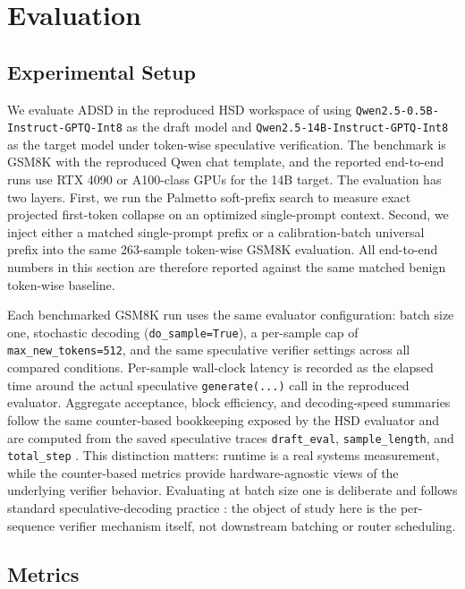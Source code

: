\section{Evaluation}
\label{sec:eval}

\subsection{Experimental Setup}

We evaluate ADSD in the reproduced HSD workspace of
\citet{zhou2026hsd} using \texttt{Qwen2.5-0.5B-Instruct-GPTQ-Int8} as the
draft model and \texttt{Qwen2.5-14B-Instruct-GPTQ-Int8} as the target model
under token-wise speculative verification. The benchmark is GSM8K with the
reproduced Qwen chat template, and the reported end-to-end runs use RTX 4090
or A100-class GPUs for the 14B target. The evaluation has two layers. First,
we run the Palmetto soft-prefix search to measure exact projected first-token
collapse on an optimized single-prompt context. Second, we inject either a matched
single-prompt prefix or a calibration-batch universal prefix into the same
263-sample token-wise GSM8K evaluation. All end-to-end numbers in this section
are therefore reported against the same matched benign token-wise baseline.

Each benchmarked GSM8K run uses the same evaluator configuration: batch size
one, stochastic decoding (\texttt{do\_sample=True}), a per-sample cap of
\texttt{max\_new\_tokens=512}, and the same speculative verifier settings
across all compared conditions. Per-sample wall-clock latency is recorded as
the elapsed time around the actual speculative \texttt{generate(...)} call in
the reproduced evaluator. Aggregate acceptance, block efficiency, and
decoding-speed summaries follow the same counter-based bookkeeping exposed by
the HSD evaluator and are computed from the saved speculative traces
\texttt{draft\_eval}, \texttt{sample\_length}, and \texttt{total\_step}
\citep{zhou2026hsd}. This distinction matters: runtime is a real systems
measurement, while the counter-based metrics provide hardware-agnostic views of
the underlying verifier behavior. Evaluating at batch size one is deliberate
and follows standard speculative-decoding practice
\citep{leviathan2023speculative,zhou2026hsd}: the object of study here is the
per-sequence verifier mechanism itself, not downstream batching or router
scheduling.

\subsection{Metrics}

